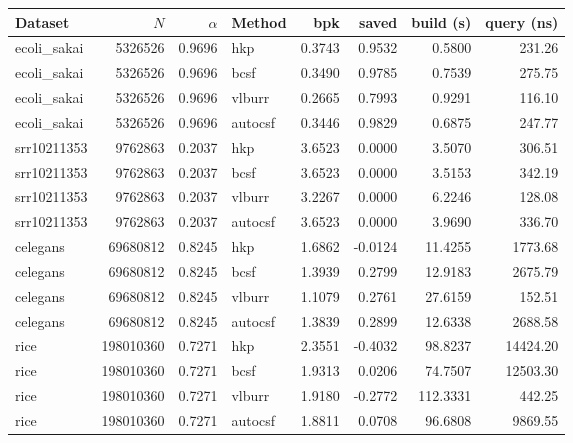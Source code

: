 \begin{tabular}{lrrlrrrr}
Dataset & $N$ & $\alpha$ & Method & bpk & saved & build (s) & query (ns) \\
\hline
ecoli\_sakai & 5326526 & 0.9696 & hkp & 0.3743 & 0.9532 & 0.5800 & 231.26 \\
ecoli\_sakai & 5326526 & 0.9696 & bcsf & 0.3490 & 0.9785 & 0.7539 & 275.75 \\
ecoli\_sakai & 5326526 & 0.9696 & vlburr & 0.2665 & 0.7993 & 0.9291 & 116.10 \\
ecoli\_sakai & 5326526 & 0.9696 & autocsf & 0.3446 & 0.9829 & 0.6875 & 247.77 \\
srr10211353 & 9762863 & 0.2037 & hkp & 3.6523 & 0.0000 & 3.5070 & 306.51 \\
srr10211353 & 9762863 & 0.2037 & bcsf & 3.6523 & 0.0000 & 3.5153 & 342.19 \\
srr10211353 & 9762863 & 0.2037 & vlburr & 3.2267 & 0.0000 & 6.2246 & 128.08 \\
srr10211353 & 9762863 & 0.2037 & autocsf & 3.6523 & 0.0000 & 3.9690 & 336.70 \\
celegans & 69680812 & 0.8245 & hkp & 1.6862 & -0.0124 & 11.4255 & 1773.68 \\
celegans & 69680812 & 0.8245 & bcsf & 1.3939 & 0.2799 & 12.9183 & 2675.79 \\
celegans & 69680812 & 0.8245 & vlburr & 1.1079 & 0.2761 & 27.6159 & 152.51 \\
celegans & 69680812 & 0.8245 & autocsf & 1.3839 & 0.2899 & 12.6338 & 2688.58 \\
rice & 198010360 & 0.7271 & hkp & 2.3551 & -0.4032 & 98.8237 & 14424.20 \\
rice & 198010360 & 0.7271 & bcsf & 1.9313 & 0.0206 & 74.7507 & 12503.30 \\
rice & 198010360 & 0.7271 & vlburr & 1.9180 & -0.2772 & 112.3331 & 442.25 \\
rice & 198010360 & 0.7271 & autocsf & 1.8811 & 0.0708 & 96.6808 & 9869.55 \\
\end{tabular}
